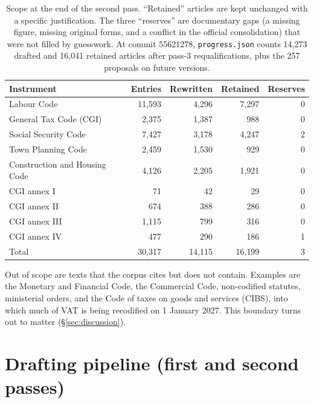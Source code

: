 \documentclass[11pt,a4paper]{article}
\begin{document}
\begin{table}[ht]
\centering
\small
\begin{tabularx}{\linewidth}{lRRRR}
\toprule
Instrument & Entries & Rewritten & Retained & Reserves\\
\midrule
Labour Code & 11{,}593 & 4{,}296 & 7{,}297 & 0\\
General Tax Code (CGI) & 2{,}375 & 1{,}387 & 988 & 0\\
Social Security Code & 7{,}427 & 3{,}178 & 4{,}247 & 2\\
Town Planning Code & 2{,}459 & 1{,}530 & 929 & 0\\
Construction and Housing Code & 4{,}126 & 2{,}205 & 1{,}921 & 0\\
CGI annex I & 71 & 42 & 29 & 0\\
CGI annex II & 674 & 388 & 286 & 0\\
CGI annex III & 1{,}115 & 799 & 316 & 0\\
CGI annex IV & 477 & 290 & 186 & 1\\
\midrule
Total & 30{,}317 & 14{,}115 & 16{,}199 & 3\\
\bottomrule
\end{tabularx}
\caption{Scope at the end of the second pass. ``Retained'' articles are kept unchanged with a specific justification. The three ``reserves'' are documentary gaps (a missing figure, missing original forms, and a conflict in the official consolidation) that were not filled by guesswork. At commit 55621278, \texttt{progress.json} counts 14{,}273 drafted and 16{,}041 retained articles after pass-3 requalifications, plus the 257 proposals on future versions.}
\label{tab:corpus}
\end{table}

Out of scope are texts that the corpus cites but does not contain. Examples are the Monetary and Financial Code, the Commercial Code, non-codified statutes, ministerial orders, and the Code of taxes on goods and services (CIBS), into which much of VAT is being recodified on 1 January 2027. This boundary turns out to matter (\S\ref{sec:discussion}).

\section{Drafting pipeline (first and second passes)}
\label{sec:drafting}
\end{document}
